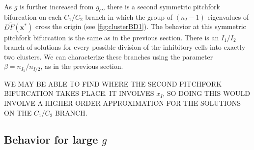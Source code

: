 \documentclass[11pt,reqno]{amsart}
\newcommand{\xvec}{\mathbf{x}}
\begin{document}
As $g$ is further increased from $g_C$, there is a second symmetric pitchfork bifurcation on each $C_1/C_2$ branch in which the group of $(n_I-1)$ eigenvalues of $D\tilde{F}(\xvec^*)$ cross the origin (see \cref{fig:clusterBD1}). The behavior at this symmetric pitchfork bifurcation is the same as in the previous section. There is an $I_1/I_2$ branch of solutions for every possible division of the inhibitory cells into exactly two clusters. We can characterize these branches using the parameter $\beta = n_{I_1}/n_{I/2}$, as in the previous section.

WE MAY BE ABLE TO FIND WHERE THE SECOND PITCHFORK BIFURCATION TAKES PLACE. IT INVOLVES $x_I$, SO DOING THIS WOULD INVOLVE A HIGHER ORDER APPROXIMATION FOR THE SOLUTIONS ON THE $C_1/C_2$ BRANCH.

\subsection{Behavior for large $g$}
\end{document}
